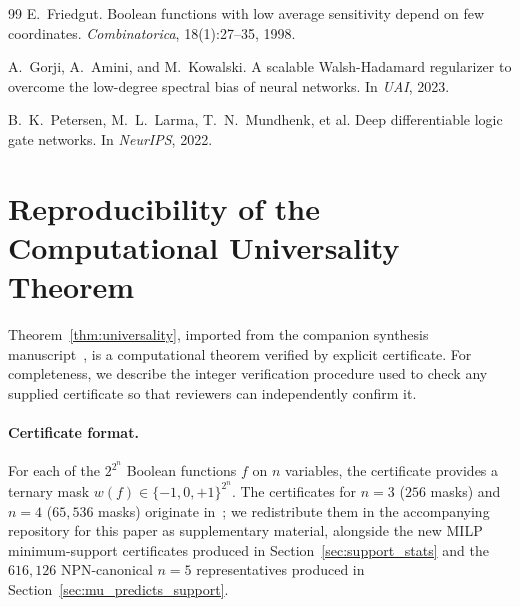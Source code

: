 \documentclass[11pt]{article}
\begin{document}
\begin{thebibliography}{99}
E.~Friedgut.
\newblock Boolean functions with low average sensitivity depend on few coordinates.
\newblock \emph{Combinatorica}, 18(1):27--35, 1998.

A.~Gorji, A.~Amini, and M.~Kowalski.
\newblock A scalable {Walsh-Hadamard} regularizer to overcome the low-degree spectral bias of neural networks.
\newblock In \emph{UAI}, 2023.

B.~K.~Petersen, M.~L.~Larma, T.~N.~Mundhenk, et al.
\newblock Deep differentiable logic gate networks.
\newblock In \emph{NeurIPS}, 2022.

\end{thebibliography}

\appendix

\section{Reproducibility of the Computational Universality Theorem}
\label{app:reproducibility}

Theorem~\ref{thm:universality}, imported from the companion synthesis manuscript~\cite{spectralSynthesisCompanion}, is a computational theorem verified by explicit certificate. For completeness, we describe the integer verification procedure used to check any supplied certificate so that reviewers can independently confirm it.

\paragraph{Certificate format.}
For each of the $2^{2^n}$ Boolean functions $f$ on $n$ variables, the certificate provides a ternary mask $w(f) \in \{-1, 0, +1\}^{2^n}$. The certificates for $n=3$ ($256$ masks) and $n=4$ ($65{,}536$ masks) originate in~\cite{spectralSynthesisCompanion}; we redistribute them in the accompanying repository for this paper as supplementary material, alongside the new MILP minimum-support certificates produced in Section~\ref{sec:support_stats} and the $616{,}126$ NPN-canonical $n=5$ representatives produced in Section~\ref{sec:mu_predicts_support}.
\end{document}
